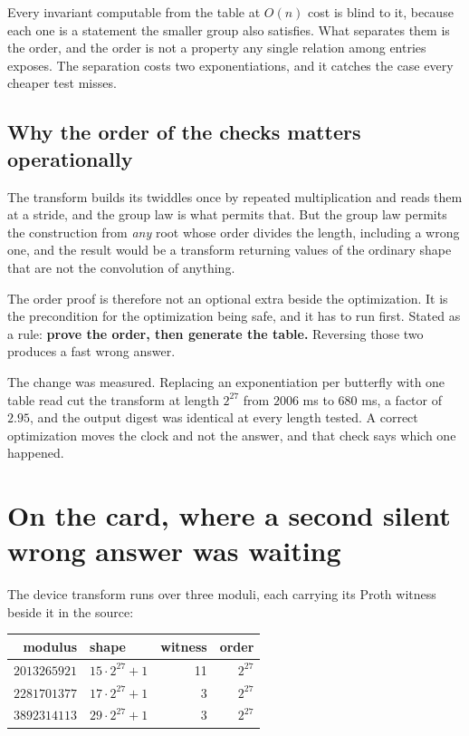 Every invariant computable from the table at \(O(n)\) cost is blind to it, because each one is a statement the smaller group also satisfies. What separates them is the order, and the order is not a property any single relation among entries exposes. The separation costs two exponentiations, and it catches the case every cheaper test misses.

\subsection{Why the order of the checks matters operationally}

The transform builds its twiddles once by repeated multiplication and reads them at a stride, and the group law is what permits that. But the group law permits the construction from \emph{any} root whose order divides the length, including a wrong one, and the result would be a transform returning values of the ordinary shape that are not the convolution of anything.

The order proof is therefore not an optional extra beside the optimization. It is the precondition for the optimization being safe, and it has to run first. Stated as a rule: \textbf{prove the order, then generate the table.} Reversing those two produces a fast wrong answer.

The change was measured. Replacing an exponentiation per butterfly with one table read cut the transform at length \(2^{27}\) from \(2006\) ms to \(680\) ms, a factor of \(2.95\), and the output digest was identical at every length tested. A correct optimization moves the clock and not the answer, and that check says which one happened.

\section{On the card, where a second silent wrong answer was waiting}

The device transform runs over three moduli, each carrying its Proth witness beside it in the source:

\begin{center}
\begin{tabular}{@{}rlrr@{}}
\toprule
modulus & shape & witness & order \\
\midrule
\(2013265921\) & \(15 \cdot 2^{27} + 1\) & 11 & \(2^{27}\) \\
\(2281701377\) & \(17 \cdot 2^{27} + 1\) & 3 & \(2^{27}\) \\
\(3892314113\) & \(29 \cdot 2^{27} + 1\) & 3 & \(2^{27}\) \\
\bottomrule
\end{tabular}
\end{center}

